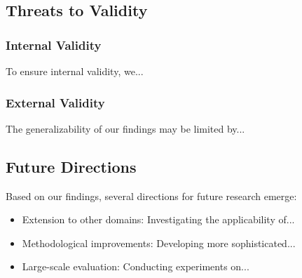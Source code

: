 \subsection{Threats to Validity}

\subsubsection{Internal Validity}
To ensure internal validity, we...

\subsubsection{External Validity}
The generalizability of our findings may be limited by...

\subsection{Future Directions}

Based on our findings, several directions for future research emerge:

\begin{itemize}
    \item Extension to other domains: Investigating the applicability of...
    \item Methodological improvements: Developing more sophisticated...
    \item Large-scale evaluation: Conducting experiments on...
\end{itemize}